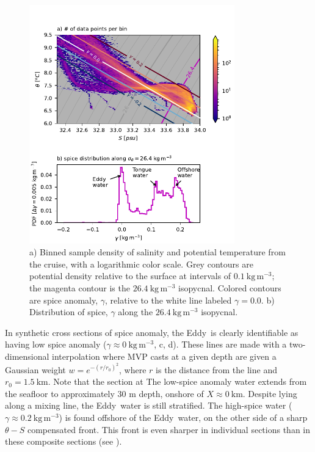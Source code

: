 \documentclass[draft]{agujournal2019}
\newcommand*{\Eddy}{{\sc Eddy}}
\begin{document}
\begin{figure}[htbp]
  \begin{center}
     \includegraphics[width=3.5in]{TSdensSpice.pdf}
    \caption{a) Binned sample density of salinity and potential temperature from the cruise, with a logarithmic color scale.  Grey contours are potential density relative to the surface at intervals of $0.1\ \mathrm{kg\,m^{-3}}$; the magenta contour is the $26.4\ \mathrm{kg\,m^{-3}}$ isopycnal.  Colored contours are spice anomaly, $\gamma$, relative to the white line labeled $\gamma=0.0$.  b) Distribution of spice, $\gamma$ along the $26.4\ \mathrm{kg\,m^{-3}}$ isopycnal.
    \label{fig:TSdensSpice}}
  \end{center}
\end{figure}

In synthetic cross sections of spice anomaly, the \Eddy\ is clearly identifiable as having low spice anomaly ($\gamma \approx 0\ \mathrm{kg\,m^{-3}}$, c, d). These lines are made with a two-dimensional interpolation where MVP casts at a given depth are given a Gaussian weight $w = e^{-(r/r_0)^2}$, where $r$ is the distance from the line and $r_0 = 1.5\ \mathrm{km}$.  Note that the section at   The low-spice anomaly water extends from the seafloor to approximately 30 m depth, onshore of $X \approx 0\ \mathrm{km}$.  Despite lying along a mixing line, the \Eddy\ water is still stratified.  The high-spice water ($\gamma \approx 0.2\ \mathrm{kg\,m^{-3}}$) is found offshore of the \Eddy\ water, on the other side of a sharp $\theta-S$ compensated front. This front is even sharper in individual sections than in these composite sections (see ).
\end{document}
